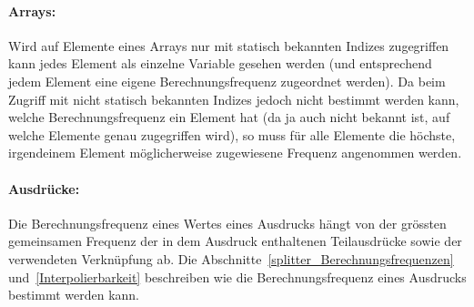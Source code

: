 \documentclass[twoside,a4paper,fleqn,12pt]{book}
\begin{document}
\paragraph{Arrays:} %
Wird auf Elemente eines Arrays nur mit statisch bekannten Indizes zugegriffen kann jedes Element als einzelne Variable gesehen werden
(und entsprechend jedem Element eine eigene Berechnungsfrequenz zugeordnet werden).
Da beim Zugriff mit nicht statisch bekannten Indizes jedoch nicht bestimmt werden kann, welche Berechnungsfrequenz ein
Element hat (da ja auch nicht bekannt ist, auf welche Elemente genau zugegriffen wird), so muss für alle Elemente die höchste, irgendeinem Element möglicherweise
zugewiesene Frequenz angenommen werden.

\paragraph{Ausdrücke:} Die Berechnungsfrequenz eines Wertes eines Ausdrucks hängt von der grössten gemeinsamen Frequenz
der in dem Ausdruck enthaltenen Teilausdrücke sowie der verwendeten Verknüpfung ab.
Die Abschnitte~\ref{splitter_Berechnungsfrequenzen} und~\ref{Interpolierbarkeit} beschreiben wie die Berechnungsfrequenz eines Ausdrucks bestimmt werden kann.


\end{document}
